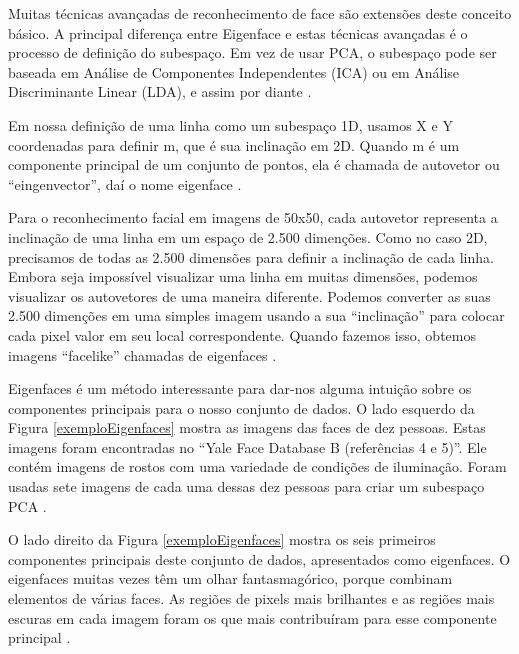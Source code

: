 Muitas técnicas avançadas de reconhecimento de face são extensões deste conceito básico. A principal diferença entre Eigenface e estas técnicas avançadas é o processo de definição do subespaço. Em vez de usar PCA, o subespaço pode ser baseada em Análise de Componentes Independentes (ICA) ou em Análise Discriminante Linear (LDA), e assim por diante \cite{hewitt}.

Em nossa definição de uma linha como um subespaço 1D, usamos X e Y coordenadas para definir m, que é sua inclinação em 2D. Quando m é um componente principal de um conjunto de pontos, ela é chamada de autovetor ou ``eingenvector'', daí o nome eigenface \cite{hewitt}. 

Para o reconhecimento facial em imagens de 50x50, cada autovetor representa a inclinação de uma linha em um espaço de 2.500 dimenções. Como no caso 2D, precisamos de todas as 2.500 dimensões para definir a inclinação de cada linha. Embora seja impossível visualizar uma linha em muitas dimensões, podemos visualizar os autovetores de uma maneira diferente. Podemos converter as suas 2.500 dimenções em uma simples imagem usando a sua ``inclinação'' para colocar cada pixel valor em seu local correspondente. Quando fazemos isso, obtemos imagens ``facelike'' chamadas de eigenfaces \cite{hewitt}.

Eigenfaces é um método interessante para dar-nos alguma intuição sobre os componentes principais para o nosso conjunto de dados. O lado esquerdo da Figura \ref{exemploEigenfaces} mostra as imagens das faces de dez pessoas. Estas imagens foram encontradas no ``Yale Face Database B (referências 4 e 5)''. Ele contém imagens de rostos com uma variedade de condições de iluminação. Foram usadas sete imagens de cada uma dessas dez pessoas para criar um subespaço PCA \cite{hewitt}. 

O lado direito da Figura \ref{exemploEigenfaces} mostra os seis primeiros componentes principais deste conjunto de dados, apresentados como eigenfaces. O eigenfaces muitas vezes têm um olhar fantasmagórico, porque combinam elementos de várias faces. As regiões de pixels mais brilhantes e as regiões mais escuras em cada imagem foram os que mais contribuíram para esse componente principal \cite{hewitt}. 

